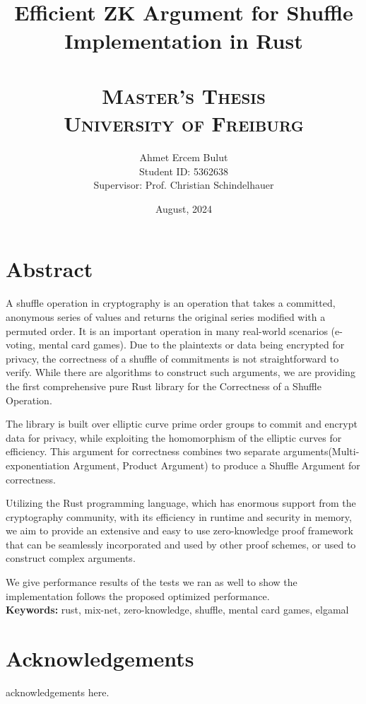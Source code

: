 \documentclass[12pt,a4paper]{report}
\title{
    \HRule \\[0.4cm]
    {\huge \bfseries  Efficient ZK Argument for Shuffle Implementation in Rust \\[0.4cm]}
    \HRule \\[1.5cm]
    \textsc{\Large Master's Thesis}\\[0.5cm]
    \textsc{\large University of Freiburg}\\[0.5cm]
}
\author{
    \Large Ahmet Ercem Bulut\\
    \Large Student ID: 5362638\\
    \Large Supervisor: Prof. Christian Schindelhauer
}
\date{August, 2024}
\begin{document}
\maketitle
\thispagestyle{empty}
\newpage

\chapter*{Abstract}
A shuffle operation in cryptography is an operation that takes a committed, anonymous series of values and returns the original series modified with a permuted order. 
It is an important operation in many real-world scenarios (e-voting, mental card games).
Due to the plaintexts or data being encrypted for privacy, the correctness of a shuffle of commitments is not straightforward to verify. While there are algorithms to construct such arguments, we are providing the first comprehensive 
pure Rust library for the Correctness of a Shuffle Operation.\par
The library is built over elliptic curve prime order groups 
to commit and encrypt data for privacy, while exploiting the homomorphism of the elliptic curves for efficiency.
This argument for correctness combines two separate arguments(Multi-exponentiation Argument, Product Argument) to produce a Shuffle Argument for correctness.\par 
Utilizing the Rust programming language, which has enormous support from the cryptography community, with its efficiency in runtime and security in memory, 
we aim to provide an extensive and easy to use zero-knowledge proof
framework that can be seamlessly incorporated and used by other proof schemes, or used to construct complex arguments.\par
We give performance results of the tests we ran as well to show the implementation follows the proposed optimized performance.\\
\textbf{Keywords:} rust, mix-net, zero-knowledge, shuffle, mental card games, elgamal

\newpage

\chapter*{Acknowledgements}
acknowledgements here.

\newpage

\tableofcontents
\end{document}

